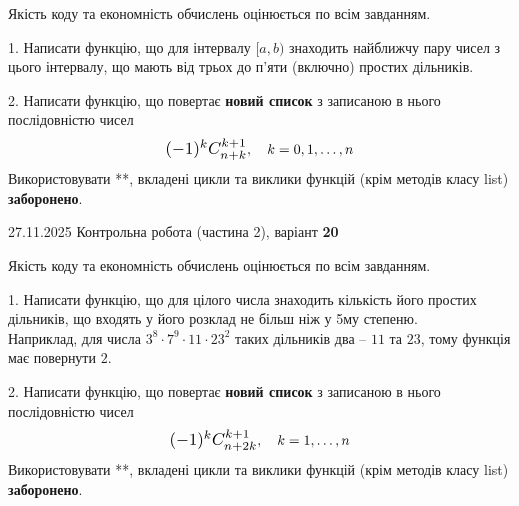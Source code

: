 \documentclass[11pt, ukrainian]{article}
\begin{document}
{{{{{{{{{{{{{{{{{{%

{
\begin {large}
Якість коду та економність обчислень оцінюється по всім завданням.


1. Написати функцію, що для інтервалу $[a, b)$ знаходить найближчу пару чисел з цього інтервалу, що мають від трьох до п'яти (включно) простих дільників.


2. 
Написати функцію, що повертає \textbf{новий список} з записаною в нього послідовністю чисел
$$\scalebox{1.2}{$(-1)^{k}C_{n+k}^{k+1}$}, \quad k=0,1,\ldots,n$$
Використовувати **, вкладені цикли та виклики функцій (крім методів класу list) \textbf{заборонено}.

\end{large}
\newpage
{{27.11.2025 Контрольна робота  (частина 2), варіант  \No \textbf { 20 }\par}}


{
\begin {large}
Якість коду та економність обчислень оцінюється по всім завданням.


1. Написати функцію, що для цілого числа знаходить кількість його простих дільників, що входять у його розклад не більш ніж у 5му степеню. \\ Наприклад, для числа $3^8{\cdot}7^9{\cdot}11{\cdot}23^{2}$ таких дільників два – $11$ та $23$, тому функція має повернути $2$.


2. 
Написати функцію, що повертає \textbf{новий список} з записаною в нього послідовністю чисел
$$\scalebox{1.2}{$(-1)^{k}C_{n+2k}^{k+1}$}, \quad k=1,\ldots,n$$
Використовувати **, вкладені цикли та виклики функцій (крім методів класу list) \textbf{заборонено}.


\end{large}}}}}}}}}}}}}}}}}}}}}
\end{document}
